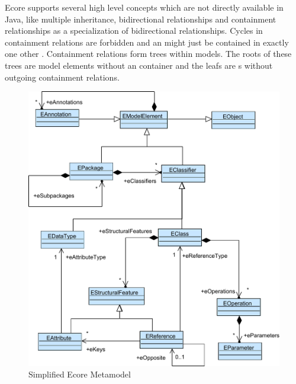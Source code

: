 Ecore supports several high level concepts which are not directly available in Java, like multiple inheritance, bidirectional relationships and containment relationships as a specialization of bidirectional relationships. Cycles in containment relations are forbidden and an  might just be contained in exactly one other . Containment relations form trees within models. The roots of these trees are model elements without an container  and the leafs are s without outgoing containment relations.  

\begin{figure}
\centering
\includegraphics[scale=0.9]{gfx/ex/Ecore} 
\caption{Simplified Ecore Metamodel}
\label{MM:Ecore}
\end{figure}
	
